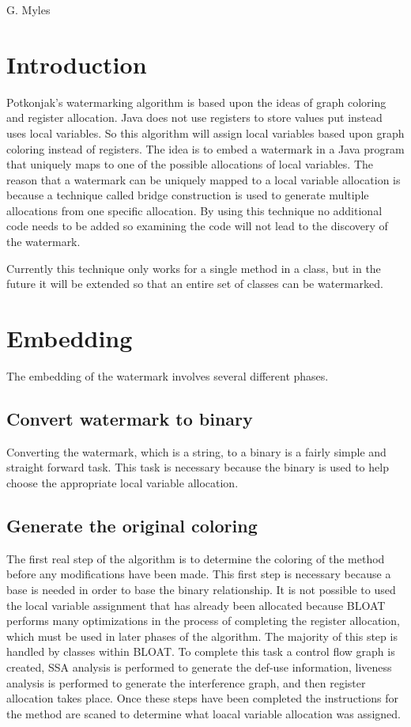 %
          {G. Myles}

\section{Introduction}
Potkonjak's watermarking algorithm is based upon the ideas of graph coloring and register allocation. Java does not use registers to store values put instead uses local variables. So this algorithm will assign local variables based upon graph coloring instead of registers. The idea is to embed a watermark in a Java program that uniquely maps to one of the possible allocations of local variables. The reason that a watermark can be uniquely mapped to a local variable allocation is because a technique called bridge construction is used to generate multiple allocations from one specific allocation. By using this technique no additional code needs to be added so examining the code will not lead to the discovery of the watermark.

Currently this technique only works for a single method in a class, but in the future it will be extended so that an entire set of classes can be watermarked.

\section{Embedding}
The embedding of the watermark involves several different phases.

\subsection{Convert watermark to binary}
Converting the watermark, which is a string, to a binary is a fairly 
simple 
and straight forward task. This task is necessary because the binary is 
used to help choose the appropriate local variable allocation.
 
\subsection{Generate the original coloring}
The first real step of the algorithm is to determine the coloring of the 
method before any modifications have been made. This first step is 
necessary because a base is needed in order to base the binary 
relationship. It is not possible to used the local variable assignment 
that has already been allocated because BLOAT performs many optimizations 
in the process of completing the register allocation, which must be used 
in later phases of the algorithm. The majority of this step is handled by 
classes 
within BLOAT. To complete this task a control flow graph 
is created, SSA analysis is performed to generate the 
def-use information, liveness analysis is performed to 
generate the interference graph, and then register 
allocation takes place. Once these steps have been 
completed the instructions for the method are scaned to 
determine what loacal variable allocation was assigned.

